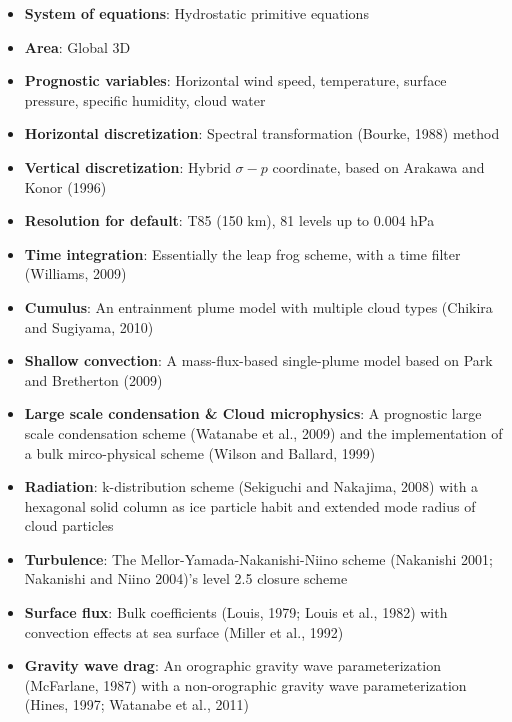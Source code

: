 \begin{itemize}
\tightlist
\item
  \textbf{System of equations}: Hydrostatic primitive equations
\item
  \textbf{Area}: Global 3D
\item
  \textbf{Prognostic variables}: Horizontal wind speed, temperature,
  surface pressure, specific humidity, cloud water
\item
  \textbf{Horizontal discretization}: Spectral transformation (Bourke,
  1988) method
\item
  \textbf{Vertical discretization}: Hybrid \(\sigma - p\) coordinate,
  based on Arakawa and Konor (1996)
\item
  \textbf{Resolution for default}: T85 (150 km), 81 levels up to 0.004
  hPa
\item
  \textbf{Time integration}: Essentially the leap frog scheme, with a
  time filter (Williams, 2009)
\item
  \textbf{Cumulus}: An entrainment plume model with multiple cloud types
  (Chikira and Sugiyama, 2010)
\item
  \textbf{Shallow convection}: A mass-flux-based single-plume model
  based on Park and Bretherton (2009)
\item
  \textbf{Large scale condensation \& Cloud microphysics}: A prognostic
  large scale condensation scheme (Watanabe et al., 2009) and the
  implementation of a bulk mirco-physical scheme (Wilson and Ballard,
  1999)
\item
  \textbf{Radiation}: k-distribution scheme (Sekiguchi and Nakajima,
  2008) with a hexagonal solid column as ice particle habit and extended
  mode radius of cloud particles
\item
  \textbf{Turbulence}: The Mellor-Yamada-Nakanishi-Niino scheme
  (Nakanishi 2001; Nakanishi and Niino 2004)'s level 2.5 closure scheme
\item
  \textbf{Surface flux}: Bulk coefficients (Louis, 1979; Louis et al.,
  1982) with convection effects at sea surface (Miller et al., 1992)
\item
  \textbf{Gravity wave drag}: An orographic gravity wave
  parameterization (McFarlane, 1987) with a non-orographic gravity wave
  parameterization (Hines, 1997; Watanabe et al., 2011)
\end{itemize}
